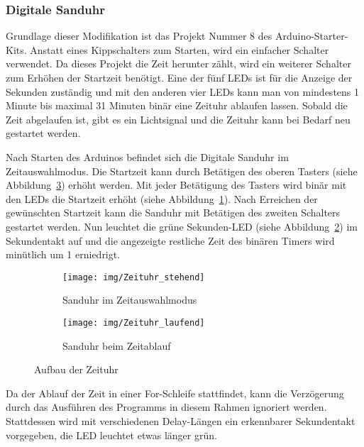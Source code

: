 \subsubsection{Digitale Sanduhr}
Grundlage dieser Modifikation ist das Projekt Nummer 8 des Arduino-Starter-Kits. Anstatt eines Kippschalters zum Starten, wird ein einfacher Schalter verwendet. Da dieses Projekt die Zeit herunter zählt, wird ein weiterer Schalter zum Erhöhen der Startzeit benötigt. Eine der fünf LEDs ist für die Anzeige der Sekunden zuständig und mit den anderen vier LEDs kann man von mindestens 1 Minute bis maximal 31 Minuten binär eine Zeituhr ablaufen lassen. Sobald die Zeit abgelaufen ist, gibt es ein Lichtsignal und die Zeituhr kann bei Bedarf neu gestartet werden.

Nach Starten des Arduinos befindet sich die Digitale Sanduhr im Zeitauswahlmodus. Die Startzeit kann durch Betätigen des oberen Tasters (siehe Abbildung~\ref{Zeituhr}) erhöht werden. Mit jeder Betätigung des Tasters wird binär mit den LEDs die Startzeit erhöht (siehe Abbildung~\ref{stehend}). Nach Erreichen der gewünschten Startzeit kann die Sanduhr mit Betätigen des zweiten Schalters gestartet werden. Nun leuchtet die grüne Sekunden-LED (siehe Abbildung~\ref{laufend}) im Sekundentakt auf und die angezeigte restliche Zeit des binären Timers wird minütlich um 1 erniedrigt.\\

\begin{figure}[h]
	\centering
	\begin{subfigure}[b]{0.48\linewidth}
		\centering
		\texttt{[image: img/Zeituhr\_stehend]}
		\caption{Sanduhr im Zeitauswahlmodus}\label{stehend}
	\end{subfigure}\enspace%
	\begin{subfigure}[b]{0.48\linewidth}
		\centering
		\texttt{[image: img/Zeituhr\_laufend]}
		\caption{Sanduhr beim Zeitablauf}\label{laufend}
	\end{subfigure}
	\caption{Aufbau der Zeituhr}\label{Zeituhr}
\end{figure}

Da der Ablauf der Zeit in einer For-Schleife stattfindet, kann die Verzögerung durch das Ausführen des Programms in diesem Rahmen ignoriert werden. Stattdessen wird mit verschiedenen Delay-Längen ein erkennbarer Sekundentakt vorgegeben, die LED leuchtet etwas länger grün. 

